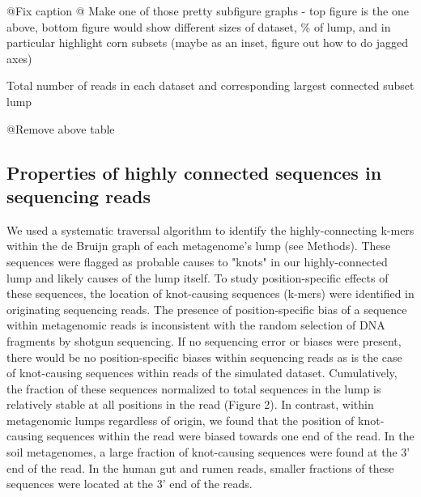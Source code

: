 \documentclass[11pt]{article} %
\begin{document}
@Fix caption
@ Make one of those pretty subfigure graphs - top figure is the one above, bottom figure would show different sizes of dataset, \% of lump, and in particular highlight corn subsets (maybe as an inset, figure out how to do jagged axes)

\begin{table}
\caption{Total number of reads in each dataset and corresponding largest connected subset lump}
\end{table}

@Remove above table


\subsection{Properties of highly connected sequences in sequencing reads}

We used a systematic traversal algorithm to identify the highly-connecting k-mers within the de Bruijn graph of each metagenome's lump (see Methods).  These sequences were flagged as probable causes to "knots" in our highly-connected lump and likely causes of the lump itself.  To study position-specific effects of these sequences, the location of knot-causing sequences (k-mers) were identified in originating sequencing reads.   
	The presence of position-specific bias of a sequence within metagenomic reads is inconsistent with the random selection of DNA fragments by shotgun sequencing.  If no sequencing error or biases were present, there would be no position-specific biases within sequencing reads as is the case of knot-causing sequences within reads of the simulated dataset.  Cumulatively, the fraction of these sequences normalized to total sequences in the lump is relatively stable at all positions in the read (Figure 2).  In contrast, within metagenomic lumps regardless of origin, we found that the position of knot-causing sequences within the read were biased towards one end of the read.  In the soil metagenomes, a large fraction of knot-causing sequences were found at the 3' end of the read.  In the human gut and rumen reads, smaller fractions of these sequences were located at the 3' end of the reads. 
\end{document}
